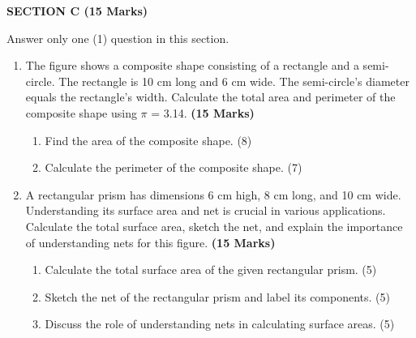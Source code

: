 \documentclass[12pt]{article}
\newcommand{\centerheading}[1]{
    \vspace{0.6em}
    \begin{center}
        {\fontsize{13}{15}\selectfont\bfseries #1}
    \end{center}
    \vspace{0.15em}
}
\newenvironment{questionblock}[1][10]{
    \par\Needspace{#1\baselineskip}
}{
    \par
}
\begin{document}
\centerheading{SECTION C (15 Marks)}
\vspace{-2.0em}
\begin{center}
  Answer only one (1) question in this section.
\end{center}
\vspace{-1.5em}

\begin{enumerate}[start=13]
  \begin{questionblock}[10]
    \item The figure shows a composite shape consisting of a rectangle and a semi-circle. The rectangle is 10 cm long and 6 cm wide. The semi-circle's diameter equals the rectangle's width. Calculate the total area and perimeter of the composite shape using $\pi$ = 3.14. \textbf{(15 Marks)}
    \begin{enumerate}
      \item Find the area of the composite shape. (8)
      \item Calculate the perimeter of the composite shape. (7)
    \end{enumerate}
  \end{questionblock}

  \begin{questionblock}[10]
    \item A rectangular prism has dimensions 6 cm high, 8 cm long, and 10 cm wide. Understanding its surface area and net is crucial in various applications. Calculate the total surface area, sketch the net, and explain the importance of understanding nets for this figure. \textbf{(15 Marks)}
    \begin{enumerate}
      \item Calculate the total surface area of the given rectangular prism. (5)
      \item Sketch the net of the rectangular prism and label its components. (5)
      \item Discuss the role of understanding nets in calculating surface areas. (5)
    \end{enumerate}
  \end{questionblock}

\end{enumerate}
\end{document}

